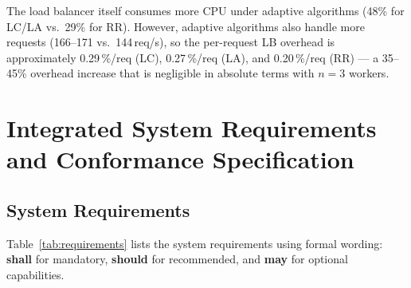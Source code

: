 \documentclass[conference]{IEEEtran}
\begin{document}
The load balancer itself consumes more CPU under adaptive algorithms
(48\% for LC/LA vs.\ 29\% for RR). However, adaptive algorithms also
handle more requests (166--171 vs.\ 144\,req/s), so the per-request LB
overhead is approximately 0.29\,\%/req (LC), 0.27\,\%/req (LA), and
0.20\,\%/req (RR) --- a 35--45\% overhead increase that is negligible
in absolute terms with $n=3$ workers.

\section{Integrated System Requirements and Conformance Specification}

\subsection{System Requirements}

Table~\ref{tab:requirements} lists the system requirements using formal
wording: \textbf{shall} for mandatory, \textbf{should} for recommended,
and \textbf{may} for optional capabilities.
\end{document}
